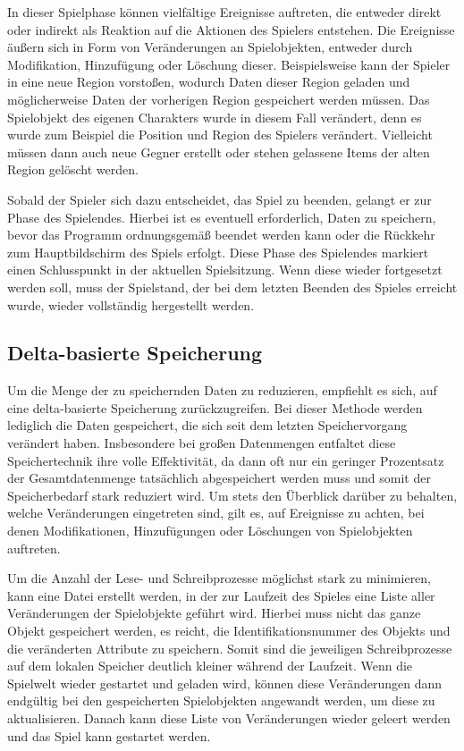 In dieser Spielphase können vielfältige Ereignisse auftreten, die entweder direkt oder indirekt als Reaktion auf die Aktionen des Spielers entstehen. Die Ereignisse äußern sich in Form von Veränderungen an Spielobjekten, entweder durch Modifikation, Hinzufügung oder Löschung dieser. Beispielsweise kann der Spieler in eine neue Region vorstoßen, wodurch Daten dieser Region geladen und möglicherweise Daten der vorherigen Region gespeichert werden müssen. Das Spielobjekt des eigenen Charakters wurde in diesem Fall verändert, denn es wurde zum Beispiel die Position und Region des Spielers verändert. Vielleicht müssen dann auch neue Gegner erstellt oder stehen gelassene Items der alten Region gelöscht werden. 

Sobald der Spieler sich dazu entscheidet, das Spiel zu beenden, gelangt er zur Phase des Spielendes. Hierbei ist es eventuell erforderlich, Daten zu speichern, bevor das Programm ordnungsgemäß beendet werden kann oder die Rückkehr zum Hauptbildschirm des Spiels erfolgt. Diese Phase des Spielendes markiert einen Schlusspunkt in der aktuellen Spielsitzung. Wenn diese wieder fortgesetzt werden soll, muss der Spielstand, der bei dem letzten Beenden des Spieles erreicht wurde, wieder vollständig hergestellt werden. 


\subsection{Delta-basierte Speicherung} \label{ssect:deltasave}
Um die Menge der zu speichernden Daten zu reduzieren, empfiehlt es sich, auf eine delta-basierte Speicherung zurückzugreifen. Bei dieser Methode werden lediglich die Daten gespeichert, die sich seit dem letzten Speichervorgang verändert haben. Insbesondere bei großen Datenmengen entfaltet diese Speichertechnik ihre volle Effektivität, da dann oft nur ein geringer Prozentsatz der Gesamtdatenmenge tatsächlich abgespeichert werden muss und somit der Speicherbedarf stark reduziert wird. Um stets den Überblick darüber zu behalten, welche Veränderungen eingetreten sind, gilt es, auf Ereignisse zu achten, bei denen Modifikationen, Hinzufügungen oder Löschungen von Spielobjekten auftreten.

Um die Anzahl der Lese- und Schreibprozesse möglichst stark zu minimieren, kann eine Datei erstellt werden, in der zur Laufzeit des Spieles eine Liste aller Veränderungen der Spielobjekte geführt wird. Hierbei muss nicht das ganze Objekt gespeichert werden, es reicht, die Identifikationsnummer des Objekts und die veränderten Attribute zu speichern. Somit sind die jeweiligen Schreibprozesse auf dem lokalen Speicher deutlich kleiner während der Laufzeit. Wenn die Spielwelt wieder gestartet und geladen wird, können diese Veränderungen dann endgültig bei den gespeicherten Spielobjekten angewandt werden, um diese zu aktualisieren. Danach kann diese Liste von Veränderungen wieder geleert werden und das Spiel kann gestartet werden.


